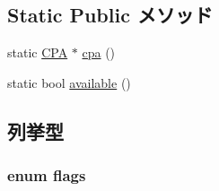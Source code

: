 \subsection*{Static Public メソッド}
\begin{DoxyCompactItemize}
\item 
static \hyperlink{classCPA_1_1CPA}{CPA} $\ast$ \hyperlink{classCPA_af57eb8a9bcb0a342b03eaa0bc6255684}{cpa} ()
\item 
static bool \hyperlink{classCPA_a98100f2f476b294d430b1a66c9039da1}{available} ()
\end{DoxyCompactItemize}


\subsection{列挙型}
\hypertarget{classCPA_ab6b306ef981f5e21bb41ea2c2dbe8cd9}{
\subsubsection[{flags}]{\setlength{\rightskip}{0pt plus 5cm}enum {\bf flags}}}
\label{classCPA_ab6b306ef981f5e21bb41ea2c2dbe8cd9}
